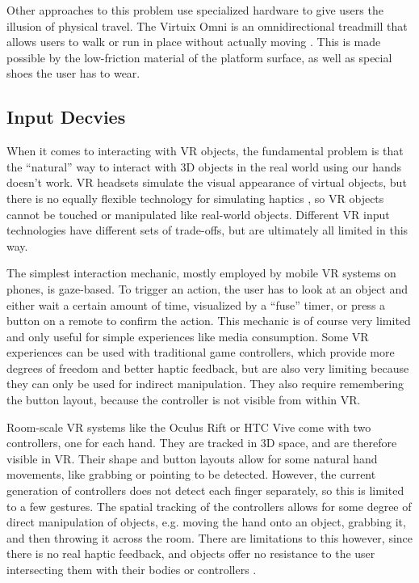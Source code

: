 \documentclass{tufte-book} %
\begin{document}
Other approaches to this problem use specialized hardware to give users the illusion of physical travel. The Virtuix Omni is an omnidirectional treadmill that allows users to walk or run in place without actually moving \cite{warren2017omni}. This is made possible by the low-friction material of the platform surface, as well as special shoes the user has to wear.

\subsection{Input Decvies}
When it comes to interacting with VR objects, the fundamental problem is that the ``natural'' way to interact with 3D objects in the real world using our hands doesn't work. VR headsets simulate the visual appearance of virtual objects, but there is no equally flexible technology for simulating haptics \cite{burdea1999keynote}, so VR objects cannot be touched or manipulated like real-world objects. Different VR input technologies have different sets of trade-offs, but are ultimately all limited in this way.

The simplest interaction mechanic, mostly employed by mobile VR systems on phones, is gaze-based. To trigger an action, the user has to look at an object and either wait a certain amount of time, visualized by a ``fuse'' timer, or press a button on a remote to confirm the action. This mechanic is of course very limited and only useful for simple experiences like media consumption. Some VR experiences can be used with traditional game controllers, which provide more degrees of freedom and better haptic feedback, but are also very limiting because they can only be used for indirect manipulation. They also require remembering the button layout, because the controller is not visible from within VR.

Room-scale VR systems like the Oculus Rift or HTC Vive come with two controllers, one for each hand. They are tracked in 3D space, and are therefore visible in VR. Their shape and button layouts allow for some natural hand movements, like grabbing or pointing to be detected. However, the current generation of controllers does not detect each finger separately, so this is limited to a few gestures. The spatial tracking of the controllers allows for some degree of direct manipulation of objects, e.g. moving the hand onto an object, grabbing it, and then throwing it across the room. There are limitations to this however, since there is no real haptic feedback, and objects offer no resistance to the user intersecting them with their bodies or controllers \cite{sanchez2005presence}.
\end{document}
